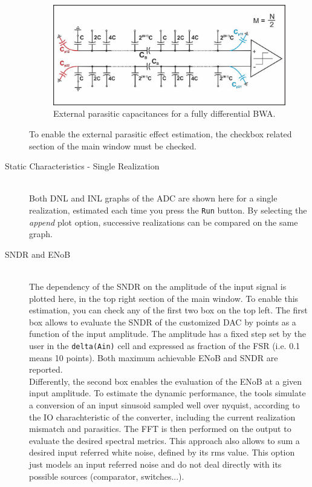 \begin{description}
\begin{figure}[h!]
	\centering
	\includegraphics[scale=0.35]{pics/viewpar.jpg}
	\caption{External parasitic capacitances for a fully differential BWA.}
	\label{fig:viewcpar}
\end{figure}
	
To enable the external parasitic effect estimation, the checkbox related section of the main window must be checked.

	\item[Static Characteristics - Single Realization] \hfill \\
	Both DNL and INL graphs of the ADC are shown here for a single realization, estimated each time you press the \texttt{Run} button. By selecting the \emph{append} plot option, successive realizations can be compared on the same graph. 

	\item[SNDR and ENoB] \hfill \\
	The dependency of the SNDR on the amplitude of the input signal is plotted here, in the top right section of the main window. 
To enable this estimation, you can check any of the first two box on the top left. The first box allows to evaluate the SNDR of the customized DAC by points as a function of the input amplitude. The amplitude has a fixed step set by the user in the \texttt{delta(Ain)} cell and expressed as fraction of the FSR (i.e. 0.1 means 10 points). Both maximum achievable ENoB and SNDR are reported. \\
Differently, the second box enables the evaluation of the ENoB at a given input amplitude.
To estimate the dynamic performance, the tools simulate a conversion of an input sinusoid sampled well over nyquist, according to the IO charachteristic of the converter, including the current realization mismatch and  parasitics. The FFT is then performed on the output to evaluate the desired spectral metrics.
This approach also allows to sum a desired input referred white noise, defined by its rms value. This option just models an input referred noise and do not deal directly with its possible sources (comparator, switches...).


\end{description}
